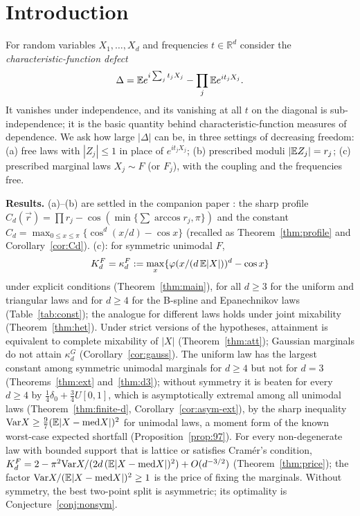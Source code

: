 \documentclass[11pt]{amsart}
\theoremstyle{definition}\newtheorem{definition}[theorem]{Definition}\theoremstyle{remark}\newtheorem{remark}[theorem]{Remark}
\begin{document}
\section{Introduction}\label{sec:intro}
For random variables $X_1,\dots,X_d$ and frequencies $t\in\mathbb R^d$ consider the \emph{characteristic-function defect}
\[\Delta=\mathbb E e^{i\sum_jt_jX_j}-\prod_j\mathbb E e^{it_jX_j}.\]
It vanishes under independence, and its vanishing at all $t$ on the diagonal is sub-independence; it is the basic quantity behind characteristic-function
measures of dependence. We ask how large $|\Delta|$ can be, in three settings of decreasing freedom: (a) free laws with $|Z_j|\le1$ in place of $e^{it_jX_j}$;
(b) prescribed moduli $|\mathbb E Z_j|=r_j$; (c) prescribed marginal laws $X_j\sim F$ (or $F_j$), with the coupling and the frequencies free.

\medskip\noindent\textbf{Results.} (a)--(b) are settled in the companion paper \cite{I}: the sharp profile $C_d(\vec r)=\prod r_j-\cos(\min\{\sum\arccos r_j,\pi\})$ and the constant
$C_d=\max_{0\le x\le\pi}\{\cos^d(x/d)-\cos x\}$ (recalled as Theorem~\ref{thm:profile} and Corollary~\ref{cor:Cd}). (c): for symmetric unimodal $F$,
\[K_d^F=\kappa_d^F:=\max_x\{\varphi(x/(d\,\mathbb E|X|))^d-\cos x\}\]
under explicit conditions (Theorem~\ref{thm:main}), for all $d\ge3$ for the uniform and triangular laws and for $d\ge4$ for the B-spline and Epanechnikov laws
(Table~\ref{tab:const}); the analogue for different laws holds under joint mixability (Theorem~\ref{thm:het}). Under strict versions of the hypotheses, attainment is equivalent to
complete mixability of $|X|$ (Theorem~\ref{thm:att}); Gaussian marginals do not attain $\kappa_d^G$ (Corollary~\ref{cor:gauss}). The uniform law has the largest constant
among symmetric unimodal marginals for $d\ge4$ but not for $d=3$ (Theorems~\ref{thm:ext} and~\ref{thm:d3}); without symmetry it is beaten for every $d\ge4$ by
$\frac14\delta_0+\frac34U[0,1]$, which is asymptotically extremal among all unimodal laws (Theorem~\ref{thm:finite-d}, Corollary~\ref{cor:asym-ext}), by the sharp inequality
$\mathrm{Var}X\ge\frac97(\mathbb E|X-\mathrm{med}X|)^2$ for unimodal laws, a moment form of the known worst-case expected shortfall (Proposition~\ref{prop:97}). For every non-degenerate law with bounded support that is lattice or satisfies Cram\'er's condition,
$K_d^F=2-\pi^2\mathrm{Var}X/(2d\,(\mathbb E|X-\mathrm{med}X|)^2)+O(d^{-3/2})$ (Theorem~\ref{thm:price}); the factor $\mathrm{Var}X/(\mathbb E|X-\mathrm{med}X|)^2\ge1$ is the price of
fixing the marginals. Without symmetry, the best two-point split is asymmetric; its optimality is Conjecture~\ref{conj:nonsym}.
\end{document}
